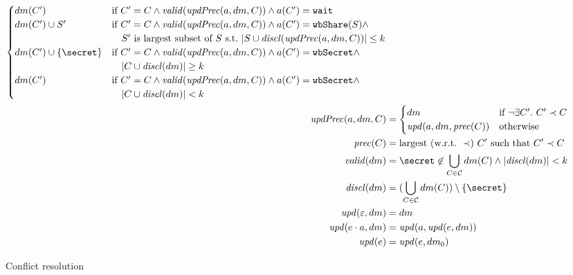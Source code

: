 \begin{figure*}
\begin{align*}
\begin{cases}
 		dm(C') &  \text{if}\ C' = C \wedge \valid{\updPrec{a}{dm}{C}} \wedge a(C') = \wait \\
 		dm(C') \cup S' &  \text{if}\ C' = C \wedge \valid{\updPrec{a}{dm}{C}} \wedge a(C') = \wShare{S} \wedge \\
 			& \quad S'\ \text{is largest subset of}\ S\ \text{s.t.}\ |S \cup \disclosed{\updPrec{a}{dm}{C}}| \leq k \\
 		dm(C') \cup \{\secret\} &  \text{if}\ C' = C \wedge \valid{\updPrec{a}{dm}{C}} \wedge a(C') = \wSecret \wedge \\
 			& \quad |C \cup \disclosed{dm}| \geq k \\	 		 
 		dm(C')  &  \text{if}\ C' = C \wedge \valid{\updPrec{a}{dm}{C}} \wedge a(C') = \wSecret \wedge \\
 			& \quad |C \cup \disclosed{dm}| < k \\	
 	\end{cases}\\
	\updPrec{a}{dm}{C} &= 
	\begin{cases}
		dm & \text{if}\ \neg \exists C'.\ C' \prec C\\
		\partialUpdateDM{a}{dm}{\predecessor{C}}	 & \text{otherwise}
	\end{cases}
	\\
	\predecessor{C} &= \text{largest}\ (\text{w.r.t.}\ \prec)\ C'\ \text{such that}\ C' \prec C \\
	\valid{dm} &= \secret \not\in \bigcup_{C \in \coalitionSchema} dm(C) \wedge |\disclosed{dm}| < k \\
	\disclosed{dm} &= (\bigcup_{C \in \coalitionSchema} dm(C)) \setminus \{\secret\}\\
	\updateDM{\emptysequence}{dm} &= dm\\
	\updateDM{e \concat a}{dm} &= \updateDM{a}{\updateDM{e}{dm}}\\
	\update{e} &= \updateDM{e}{dm_0}
\end{align*}
\caption{Conflict resolution}\label{figure:conflict-resolution}
\end{figure*}


